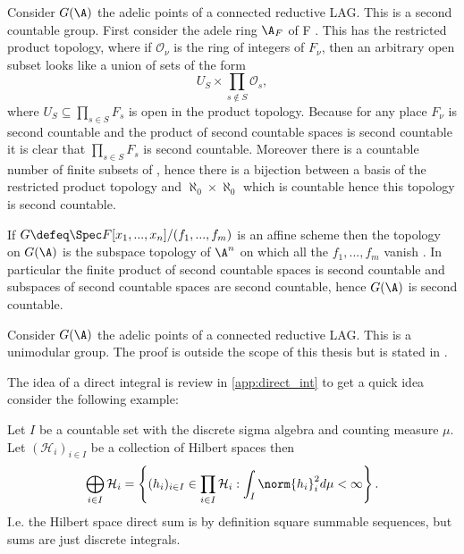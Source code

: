\begin{example}
    Consider \(G(\A)\) the adelic points of a connected reductive LAG. This is a second countable group. First consider the adele ring \(\A_F\) of F . This has the restricted product topology, where if \(\mathcal{O}_\nu\) is the ring of integers of \(F_\nu\), then an arbitrary open subset looks like a union of sets of the form 
    \[U_S \times \prod_{s\notin S} \mathcal{O}_s,\]
    where \(U_S\subseteq \prod_{s\in S}F_s\) is open in the product topology. 
    Because for any place \(F_\nu\) is second countable and the product of second countable spaces is second countable it is clear that \(\prod_{s\in S} F_s\) is second countable. Moreover there is a countable number of finite subsets of \Z, hence there is a bijection between a basis of the restricted product topology and \(\aleph_0\times \aleph_0 \) which is countable hence this topology is second countable.
    
    If \(G \defeq \Spec F[x_1, ..., x_n]/(f_1, ..., f_m)\) is an affine scheme then the topology on \(G(\A)\) is the subspace topology of \(\A^n\) on which all the \(f_1, ..., f_m\) vanish \cite{conradWeilGrothendieckApproaches2012}. In particular the finite product of second countable spaces is second countable and subspaces of second countable spaces are second countable, hence \(G(\A)\) is second countable. 
\end{example}

\begin{example}
    Consider \(G(\A)\) the adelic points of a connected reductive LAG. This is a unimodular group. The proof is outside the scope of this thesis but is stated in \cite[Lem. 2]{conradStanfordNumberTheory}.
\end{example}

The idea of a direct integral is review in \ref{app:direct_int} to get a quick idea consider the following example:
\begin{example}
    Let \(I\) be a countable set with the discrete sigma algebra and counting measure \(\mu\). Let \((\mathcal{H}_i)_{i\in I}\) be a collection of Hilbert spaces then
    \[\bigoplus_{i\in I} \mathcal{H}_i = \left\{ (h_i)_{i\in I}\in \prod_{i\in I} \mathcal{H}_i : \int_I \norm{h_i}_i^2 d\mu <\infty \right\}.\]
    I.e. the Hilbert space direct sum is by definition square summable sequences, but sums are just discrete integrals.
\end{example}

